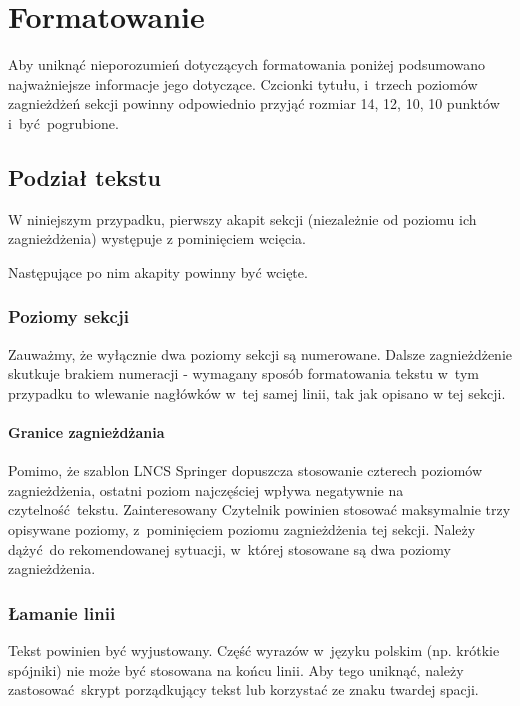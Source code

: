 \section{Formatowanie}
\label{sec:formatting}

Aby uniknąć nieporozumień dotyczących formatowania poniżej podsumowano najważniejsze informacje jego dotyczące. Czcionki tytułu, i~trzech poziomów zagnieżdżeń sekcji powinny odpowiednio przyjąć rozmiar 14, 12, 10, 10 punktów i~być pogrubione.

\subsection{Podział tekstu}
\label{subsec:textDivision}

W niniejszym przypadku, pierwszy akapit sekcji (niezależnie od poziomu ich zagnieżdżenia) występuje z pominięciem wcięcia.

Następujące po nim akapity powinny być wcięte.

\subsubsection{Poziomy sekcji}
\label{subsubsec:levels}

Zauważmy, że wyłącznie dwa poziomy sekcji są numerowane. Dalsze zagnieżdżenie skutkuje brakiem numeracji - wymagany sposób formatowania tekstu w~tym przypadku to wlewanie nagłówków w~tej samej linii, tak jak opisano w tej sekcji.

\paragraph{Granice zagnieżdżania}
\label{par:nestingLimits}

Pomimo, że szablon LNCS Springer dopuszcza stosowanie czterech poziomów zagnieżdżenia, ostatni poziom najczęściej wpływa negatywnie na czytelność tekstu. Zainteresowany Czytelnik powinien stosować maksymalnie trzy opisywane poziomy, z~pominięciem poziomu zagnieżdżenia tej sekcji. Należy dążyć do rekomendowanej sytuacji, w~której stosowane są dwa poziomy zagnieżdżenia.

\subsubsection{Łamanie linii}
\label{subsubsec:linebreak}

Tekst powinien być wyjustowany. Część wyrazów w~języku polskim (np. krótkie spójniki) nie może być stosowana na końcu linii. Aby tego uniknąć, należy zastosować skrypt porządkujący tekst lub korzystać ze znaku twardej spacji.


